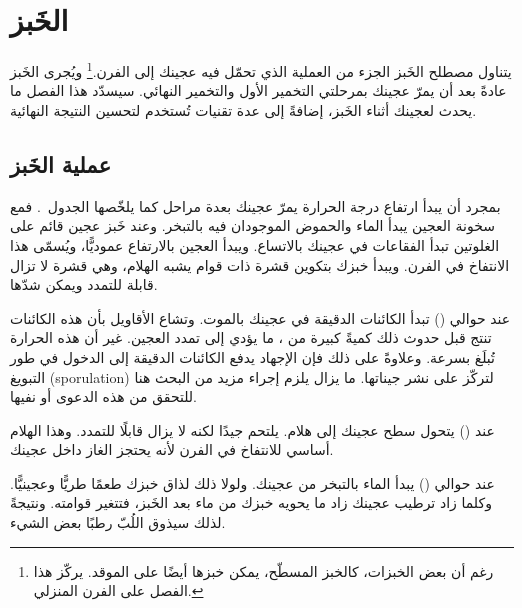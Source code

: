\chapter{الخَبز}%
\label{ch:baking}
\begin{quoting}
يتناول مصطلح الخَبز الجزء من العملية الذي تحمّل فيه عجينك إلى الفرن.\footnote{رغم أن بعض الخبزات، كالخبز المسطّح، يمكن خبزها أيضًا على الموقد. يركّز هذا الفصل على الفرن المنزلي.} ويُجرى الخَبز عادةً بعد أن يمرّ عجينك بمرحلتي التخمير الأول والتخمير النهائي. سيسدّد هذا الفصل ما يحدث لعجينك أثناء الخَبز، إضافةً إلى عدة تقنيات تُستخدم لتحسين النتيجة النهائية.
\end{quoting}

\section{عملية الخَبز}
بمجرد أن يبدأ ارتفاع درجة الحرارة يمرّ عجينك بعدة مراحل كما يلخّصها الجدول~\LR{\ref{tab:baking-stages}}. فمع سخونة العجين يبدأ الماء والحموض الموجودان فيه بالتبخر. وعند خَبز عجين قائم على الغلوتين تبدأ الفقاعات في عجينك بالاتساع. ويبدأ العجين بالارتفاع عموديًّا، ويُسمّى هذا الانتفاخ في الفرن. ويبدأ خبزك بتكوين قشرة ذات قوام يشبه الهلام، وهي قشرة لا تزال قابلة للتمدد ويمكن شدّها.

\begin{table}[htp!]
    \centering
        
        \caption[مراحل العجين أثناء الخَبز]{المراحل المختلفة التي يمرّ بها عجينك خلال عملية الخَبز.}%
        \label{tab:baking-stages}
\end{table}

عند حوالي  () تبدأ الكائنات الدقيقة في عجينك بالموت. وتشاع الأقاويل بأن هذه الكائنات تنتج قبل حدوث ذلك كميةً كبيرة من ، ما يؤدي إلى تمدد العجين. غير أن هذه الحرارة تُبلَغ بسرعة. وعلاوةً على ذلك فإن الإجهاد يدفع الكائنات الدقيقة إلى الدخول في طور التبويغ \textenglish{(sporulation)} لتركّز على نشر جيناتها. ما يزال يلزم إجراء مزيد من البحث هنا للتحقق من هذه الدعوى أو نفيها.

عند  () يتحول سطح عجينك إلى هلام. يلتحم جيدًا لكنه لا يزال قابلًا للتمدد. وهذا الهلام أساسي للانتفاخ في الفرن لأنه يحتجز الغاز داخل عجينك.

عند حوالي  () يبدأ الماء بالتبخر من عجينك. ولولا ذلك لذاق خبزك طعمًا طريًّا وعجينيًّا. وكلما زاد ترطيب عجينك زاد ما يحويه خبزك من ماء بعد الخَبز، فتتغير قوامته. ونتيجةً لذلك سيذوق اللُبّ رطبًا بعض الشيء.

